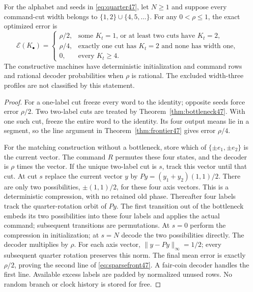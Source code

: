 \begin{theorem}\label{thm:sparsefront47}
For the alphabet and seeds in \eqref{eq:quarter47}, let $N\ge1$ and
suppose every command-cut width belongs to $\{1,2\}\cup\{4,5,\ldots\}$.
For any $0<\rho\le1$, the exact optimized error is
\begin{equation}\label{eq:sparsefront47}
 \mathcal E(K_\bullet)=
 \begin{cases}
  \rho/2,&\text{some $K_t=1$, or at least two cuts have $K_t=2$},\\
  \rho/4,&\text{exactly one cut has $K_t=2$ and none has width one},\\
  0,&\text{every $K_t\ge4$}.
 \end{cases}
\end{equation}
The constructive machines have deterministic initialization and command
rows and rational decoder probabilities when $\rho$ is rational.
The excluded width-three profiles are not classified by this statement.
\end{theorem}
\begin{proof}
For a one-label cut freeze every word to the identity; opposite seeds
force error $\rho/2$. Two two-label cuts are treated by
Theorem~\ref{thm:bottleneck47}. With one such cut, freeze the entire
word to the identity. Its four output means lie in a segment, so the
line argument in Theorem~\ref{thm:frontier47} gives error $\rho/4$.

For the matching construction without a bottleneck, store which of
$\{\pm e_1,\pm e_2\}$ is the current vector. The command $R$ permutes
these four states, and the decoder is $\rho$ times the vector.
If the unique two-label cut is $s$, track this vector until that cut.
At cut $s$ replace the current vector $y$ by
$P y=(y_1+y_2)(1,1)/2$. There are only two possibilities,
$\pm(1,1)/2$, for these four axis vectors. This is a deterministic
compression, with no retained old phase. Thereafter four labels track
the quarter-rotation orbit of $Py$. The first transition out of the
bottleneck embeds its two possibilities into these four labels and
applies the actual command; subsequent transitions are permutations.
At $s=0$ perform the compression in initialization; at $s=N$ decode the
two possibilities directly. The decoder multiplies by $\rho$.
For each axis vector, $\|y-Py\|_\infty=1/2$; every subsequent quarter
rotation preserves this norm. The final mean error is exactly
$\rho/2$, proving the second line of \eqref{eq:sparsefront47}.
A fair-coin decoder handles the first line. Available excess labels
are padded by normalized unused rows. No random branch or clock
history is stored for free.
\end{proof}

